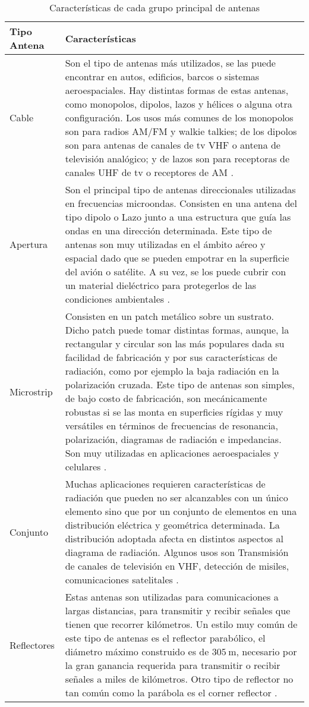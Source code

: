 \begin{table}[H]
  \caption{Características de cada grupo principal de antenas}
  \footnotesize
  \centering
  \begin{tabular}{l p{12.5cm}}
  \toprule
  \textbf{Tipo Antena} & \textbf{Características} \tabularnewline
  \midrule
  Cable & Son el tipo de antenas más utilizados, se las puede encontrar en autos, edificios, barcos o sistemas aeroespaciales. Hay distintas formas de estas antenas, como monopolos, dipolos, lazos y hélices o alguna otra configuración. Los usos más comunes de los monopolos son para radios AM/FM y walkie talkies; de los dipolos son para antenas de canales de tv VHF o antena de televisión analógico; y de lazos son para receptoras de canales UHF de tv o receptores de AM \cite{Balanis2012}. \tabularnewline

  Apertura & Son el principal tipo de antenas direccionales utilizadas en frecuencias microondas. Consisten en una antena
  del tipo dipolo o Lazo junto a una estructura que guía las ondas en una dirección determinada. Este tipo de antenas son muy utilizadas en el ámbito aéreo y espacial dado que se pueden empotrar en la superficie del avión o satélite. A su vez, se los puede cubrir con un material dieléctrico para protegerlos de las condiciones ambientales \cite{Balanis2012}. \tabularnewline
  
  Microstrip & Consisten en un patch metálico sobre un sustrato. Dicho patch puede tomar distintas formas, aunque, la rectangular y circular son las más populares dada su facilidad de fabricación y por sus características de radiación, como por ejemplo la baja radiación en la polarización cruzada. Este tipo de antenas son simples, de bajo costo de fabricación, son mecánicamente robustas si se las monta en superficies rígidas y muy versátiles en términos de frecuencias de resonancia, polarización, diagramas de radiación e impedancias. Son muy utilizadas en aplicaciones aeroespaciales y celulares \cite{Balanis2012}. \tabularnewline

  Conjunto & Muchas aplicaciones requieren características de radiación que pueden no ser alcanzables con un único elemento sino que por un conjunto de elementos en una distribución eléctrica y geométrica determinada. La distribución adoptada afecta en distintos aspectos al diagrama de radiación. Algunos usos son Transmisión de canales de televisión en VHF, detección de misiles, comunicaciones satelitales \cite{Balanis2012}. \tabularnewline
  
  Reflectores & Estas antenas son utilizadas para comunicaciones a largas distancias, para transmitir y recibir señales que tienen que recorrer kilómetros. Un estilo muy común de este tipo de antenas es el reflector parabólico, el diámetro máximo construido es de $\SI{305}{\meter}$, necesario por la gran ganancia requerida para transmitir o recibir señales a miles de kilómetros. Otro tipo de reflector no tan común como la parábola es el corner reflector \cite{Balanis2012}. \tabularnewline


\end{tabular}
\end{table}
